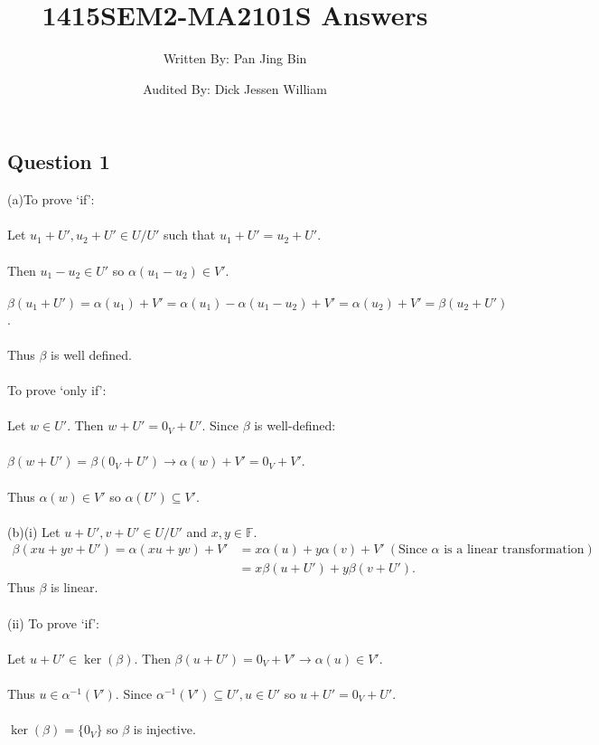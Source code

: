 \documentclass{article}
\title{1415SEM2-MA2101S Answers}
\author{Written By: Pan Jing Bin}
\date{Audited By: Dick Jessen William}
\begin{document}
\maketitle
\subsection*{Question 1}
(a)To prove `if':\\\\
Let $u_1 + U',u_2 + U' \in U/U'$ such that $u_1+U' = u_2+U'$.\\\\
Then $u_1-u_2 \in U'$ so $\alpha(u_1-u_2) \in V'.$\\\\
$\beta(u_1+U') = \alpha(u_1) + V' = \alpha(u_1) - \alpha(u_1-u_2) + V' = \alpha(u_2) + V' = \beta(u_2 + U')$.\\\\
Thus $\beta$ is well defined.\\\\
To prove `only if':\\\\
Let $w\in U'$. Then $w+U' = 0_V + U'$. Since $\beta$ is well-defined:\\\\
$\beta(w+U') = \beta(0_V + U') \to \alpha(w) + V' = 0_V + V'$.\\\\
Thus $\alpha(w) \in V'$ so $\alpha(U')\subseteq V'$.\\\\
(b)(i) Let $u+U',v+U'\in U/U'$ and $x,y\in \mathbb{F}$.
\begin{align*}
\beta(xu + yv + U') = \alpha(xu+yv) + V'  &= x\alpha(u) + y\alpha(v) + V' \ (\text{Since } \alpha \text{ is a linear transformation})\\ &= x\beta(u+U') + y\beta(v+U').
\end{align*}
Thus $\beta$ is linear.\\\\
(ii) To prove `if':\\\\
Let $u+U' \in \ker(\beta)$. Then $\beta(u+U') = 0_V + V' \to \alpha(u) \in V'$.\\\\
Thus $u\in\alpha^{-1}(V')$. Since $\alpha^{-1}(V')\subseteq U', u\in U'$ so $u+U' = 0_V + U'$.\\\\
$\ker(\beta) = \{0_V\}$ so $\beta$ is injective.\\\\
\end{document}
